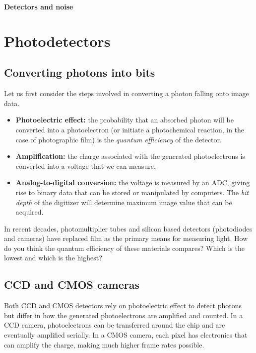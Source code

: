 \documentclass[a4paper]{report}
\newcommand{\nexercise}[0]{\arabic{exercises}\addtocounter{exercises}{1}}
\begin{document}
\addtocounter{exercises}{1}

\begin{center}
\textbf{\Large{Detectors and noise}}
\end{center}
\section{Photodetectors}
\subsection{Converting photons into bits}
Let us first consider the steps involved in converting a photon falling onto image data. 
\begin{itemize}
	\item \textbf{Photoelectric effect:} the probability that an absorbed photon will be converted into a photoelectron (or initiate a photochemical reaction, in the case of photographic film) is the \textit{quantum efficiency} of the detector.
	\item \textbf{Amplification:} the charge associated with the generated photoelectrons is converted into a voltage that we can measure. 
	\item \textbf{Analog-to-digital conversion:} the voltage is measured by an ADC, giving rise to binary data that can be stored or manipulated by computers. The \textit{bit depth} of the digitizer will determine maximum image value that can be acquired.
\end{itemize}

\begin{exercisebox}[frametitle={Exercise \nexercise: Quantum efficiency of different materials}]
In recent decades, photomultiplier tubes and silicon based detectors (photodiodes and cameras) have replaced film as the primary means for measuring light.
How do you think the quantum efficiency of these materials compares? 
Which is the lowest and which is the highest?
\end{exercisebox}

\subsection{CCD and CMOS cameras}
Both CCD and CMOS detectors rely on photoelectric effect to detect photons but differ in how the generated photoelectrons are amplified and counted. 
In a CCD camera, photoelectrons can be transferred around the chip and are eventually amplified serially. 
In a CMOS camera, each pixel has electronics that can amplify the charge, making much higher frame rates possible.
\end{document}
